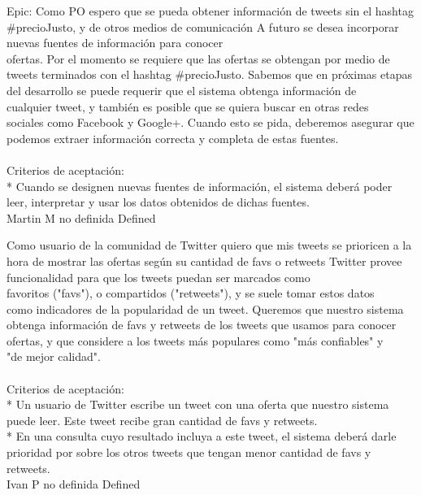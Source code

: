 \vspace{20pt}

	{Epic: Como PO espero que se pueda obtener información de tweets sin el hashtag #precioJusto, y de otros medios de comunicación} %
	{A futuro se desea incorporar nuevas fuentes de información para conocer\\
ofertas. Por el momento se requiere que las ofertas se obtengan por medio de\\
tweets terminados con el hashtag #precioJusto. Sabemos que en próximas etapas\\
del desarrollo se puede requerir que el sistema obtenga información de\\
cualquier tweet, y también es posible que se quiera buscar en otras redes\\
sociales como Facebook y Google+. Cuando esto se pida, deberemos asegurar que\\
podemos extraer información correcta y completa de estas fuentes.\\
  \\
Criterios de aceptación:\\
* Cuando se designen nuevas fuentes de información, el sistema deberá poder leer, interpretar y usar los datos obtenidos de dichas fuentes.\\
} %
	{} %
	{} %
	{Martin M} %
	{no definida} %
	{Defined} %


\vspace{20pt}

	{Como usuario de la comunidad de Twitter quiero que mis tweets se prioricen a la hora de mostrar las ofertas según su cantidad de favs o retweets} %
	{Twitter provee funcionalidad para que los tweets puedan ser marcados como\\
favoritos ("favs"), o compartidos ("retweets"), y se suele tomar estos datos\\
como indicadores de la popularidad de un tweet. Queremos que nuestro sistema\\
obtenga información de favs y retweets de los tweets que usamos para conocer\\
ofertas, y que considere a los tweets más populares como "más confiables" y\\
"de mejor calidad".\\
  \\
Criterios de aceptación:\\
* Un usuario de Twitter escribe un tweet con una oferta que nuestro sistema puede leer. Este tweet recibe gran cantidad de favs y retweets.  \\
* En una consulta cuyo resultado incluya a este tweet, el sistema deberá darle prioridad por sobre los otros tweets que tengan menor cantidad de favs y retweets.\\
} %
	{} %
	{} %
	{Ivan P} %
	{no definida} %
	{Defined} %


